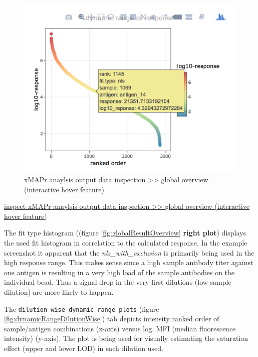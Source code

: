 \documentclass[
]{book}
\begin{document}
\begin{figure}

{\centering \includegraphics[width=14.56in]{figures/global_result_overview1} 

}

\caption{xMAPr anaylsis output data inspection >> global overview (interactive hover feature)}\label{fig:globalResultOverview1}
\end{figure}

\href{figures/global_result_overview1.png}{inspect xMAPr anaylsis output data inspection \textgreater\textgreater{} global overview (interactive hover feature)}

The fit type histogram ((figure \ref{fig:globalResultOverview} \textbf{right plot}) displays the used fit histogram in correlation to the calculated response. In the example screenshot it apparent that the \emph{nls\_with\_exclusion} is primarily being used in the high response range. This makes sense since a high sample antibody titer against one antigen is resulting in a very high load of the sample antibodies on the individual bead. Thus a signal drop in the very first dilutions (low sample dilution) are more likely to happen.

The \texttt{dilution\ wise\ dynamic\ range\ plots} (figure \ref{fig:dynamicRangeDilutionWise}) tab depicts intensity ranked order of sample/antigen combinations (x-axis) versus log. MFI (median fluorescence intensity) (y-axis). The plot is being used for visually estimating the saturation effect (upper and lower LOD) in each dilution used.
\end{document}
